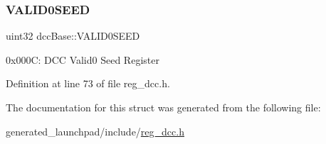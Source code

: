 \subsubsection{\texorpdfstring{V\+A\+L\+I\+D0\+S\+E\+ED}{VALID0SEED}}
{\footnotesize\ttfamily uint32 dcc\+Base\+::\+V\+A\+L\+I\+D0\+S\+E\+ED}

0x000C\+: D\+CC Valid0 Seed Register 

Definition at line 73 of file reg\+\_\+dcc.\+h.



The documentation for this struct was generated from the following file\+:\begin{DoxyCompactItemize}
\item 
generated\+\_\+launchpad/include/\mbox{\hyperlink{reg__dcc_8h}{reg\+\_\+dcc.\+h}}\end{DoxyCompactItemize}
